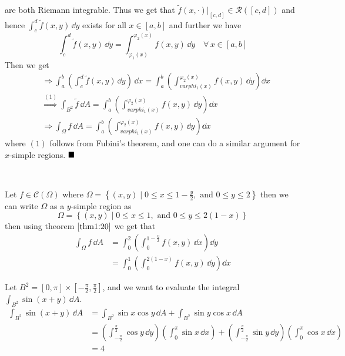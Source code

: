 \documentclass[../Analysis-3]{subfiles}
\begin{document}
are both Riemann integrable. Thus we get that $\tilde{f}(x,\cdot)\vert_{[c,d]} \in \mathscr{R}([c,d])$ and hence $\displaystyle{\int_c^d \tilde{f}(x,y) \, \dd y}$ exists for all $x \in [a,b]$ and further we have 
\[
    \int_c^d \tilde{f}(x,y) \, \dd y = \int_{\varphi_1(x)}^{\varphi_2(x)} f(x,y) \, \dd y \quad \forall \, x \in [a,b]    
\]
Then we get 
\begin{align*}
    &\Longrightarrow \int_a^b \left( \int_c^d \tilde{f}(x,y) \, \dd y\right)\, \dd x = \int_a^b \left( \int_{varphi_1(x)}^{\varphi_2(x)} f(x,y) \, \dd y\right) \dd x \\ 
    &\overset{(1)}{\Longrightarrow} \int_{B^2} \tilde{f} \, \dd A = \int_a^b \left( \int_{varphi_1(x)}^{\varphi_2(x)} f(x,y) \, \dd y\right) \dd x \\ 
    &\Longrightarrow \int_{\Omega} f \, \dd A = \int_a^b \left( \int_{varphi_1(x)}^{\varphi_2(x)} f(x,y) \, \dd y\right) \dd x
\end{align*}
where $(1)$ follows from Fubini's theorem, and one can do a similar argument for $x$-simple regions. $\hfill \blacksquare$

\

\begin{Eg}{}{}
    Let $f \in \mathscr{C}(\Omega)$ where $\Omega = \left\{ (x,y) \mid 0 \leq x \leq 1 - \frac{y}{2}, \mbox{ and } 0 \leq y \leq 2 \right\}$ then we can write $\Omega$ as a $y$-simple region as 
    \[
        \Omega = \left\{ (x,y) \mid 0 \leq x \leq 1, \mbox{ and } 0 \leq y \leq 2(1-x) \right\}    
    \]
    then using theorem $\ref{thm1:20}$ we get that 
    \begin{align*}
        \int_{\Omega} f \, \dd A &= \int_0^2 \left( \int_0^{1-\frac{y}{2}} f(x,y) \, \dd x\right) \dd y \\ 
        &= \int_0^1 \left( \int_0^{2(1-x)} f(x,y) \, \dd y\right) \dd x
    \end{align*}
\end{Eg}

\begin{Eg}{}{}
    Let $B^2 = [0,\pi] \times [-\frac{\pi}{2}, \frac{\pi}{2}]$, and we want to evaluate the integral $\int_{B^2} \sin (x+y) \, \dd A$. 
    \begin{align*}
        \int_{B^2}\sin(x+y) \, \dd A &= \int_{B^2} \sin x \cos y \, \dd A + \int_{B^2} \sin y \cos x \, \dd A \\ 
        &= \left( \int_{-\frac{\pi}{2}}^{\frac{\pi}{2}} \cos y \, \dd y\right)\left( \int_{0}^{\pi} \sin x \, \dd x\right) + \left( \int_{-\frac{\pi}{2}}^{\frac{\pi}{2}} \sin y \, \dd y\right)\left( \int_{0}^{\pi} \cos x \, \dd x\right) \\ 
        &= 4 
    \end{align*}
\end{Eg}
\end{document}
